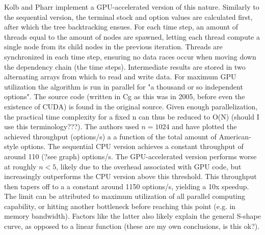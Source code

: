 \documentclass[english,12pt,a4paper,pdftex,sci,utf8]{aaltothesis}
\begin{document}
Kolb and Pharr \cite{pharr2005gpu} implement a GPU-accelerated version of this nature. Similarly to the sequential version, the terminal stock and option values are calculated first, after which the tree backtracking ensues. For each time step, an amount of threads equal to the amount of nodes are spawned, letting each thread compute a single node from its child nodes in the previous iteration. Threads are synchronized in each time step, ensuring no data races occur when moving down the dependency chain (the time steps). Intermediate results are stored in two alternating arrays from which to read and write data. For maximum GPU utilization the algorithm is run in parallel for "a thousand or so independent options". The source code (written in Cg as this was in 2005, before even the existence of CUDA) is found in the original source. Given enough parallelization, the practical time complexity for a fixed n can thus be reduced to O(N) (should I use this terminology???). The authors used $n=1024$ and have plotted the achieved throughput (options/s) a a function of the total amount of American-style options. The sequential CPU version achieves a constant throughput of around 110 (?see graph) options/s. The GPU-accelerated version performs worse at roughly $n < 5$, likely due to the overhead associated with GPU code, but increasingly outperforms the CPU version above this threshold. This throughput then tapers off to a a constant around 1150 options/s, yielding a 10x speedup. The limit can be attributed to maximum utilization of all parallel computing capability, or hitting another bottleneck before reaching this point (e.g. in memory bandwidth). Factors like the latter also likely explain the general S-shape curve, as opposed to a linear function (these are my own conclusions, is this ok?).
\end{document}
